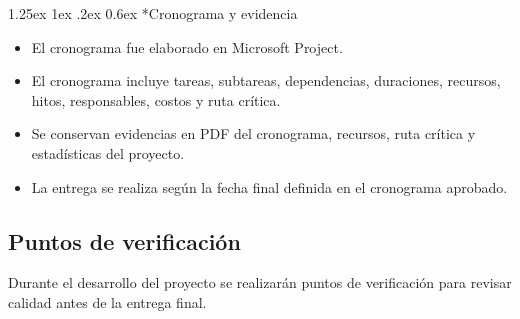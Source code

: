 \documentclass[11pt,spanish]{article}
\makeatletter
\renewcommand\paragraph{\@startsection{paragraph}{4}{\z@}%
  {1.25ex \@plus1ex \@minus.2ex}%
  {0.6ex}%
  {\normalfont\normalsize\bfseries}}
\makeatother
\begin{document}
\paragraph*{Cronograma y evidencia}

\begin{itemize}[leftmargin=*]
    \item El cronograma fue elaborado en Microsoft Project.
    \item El cronograma incluye tareas, subtareas, dependencias, duraciones, recursos, hitos, responsables, costos y ruta crítica.
    \item Se conservan evidencias en PDF del cronograma, recursos, ruta crítica y estadísticas del proyecto.
    \item La entrega se realiza según la fecha final definida en el cronograma aprobado.
\end{itemize}

\subsection{Puntos de verificación}

Durante el desarrollo del proyecto se realizarán puntos de verificación para revisar calidad antes de la entrega final.
\end{document}
